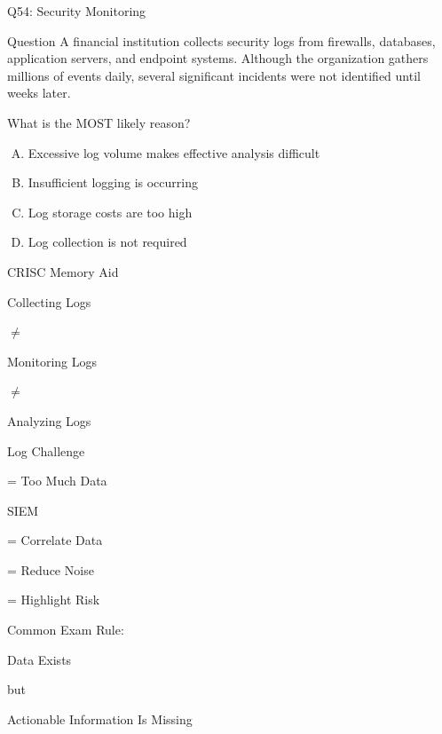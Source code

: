 \documentclass{beamer}
\begin{document}
	
	
	\begin{frame}[shrink=10]{Q54: Security Monitoring}
		\begin{block}{Question}
			A financial institution collects security logs from firewalls,
			databases, application servers, and endpoint systems. Although
			the organization gathers millions of events daily, several
			significant incidents were not identified until weeks later.
			
			What is the MOST likely reason?
		\end{block}
		
		\begin{enumerate}[(A)]
			\item Excessive log volume makes effective analysis difficult
			\item Insufficient logging is occurring
			\item Log storage costs are too high
			\item Log collection is not required
		\end{enumerate}
				\begin{block}{CRISC Memory Aid}
			
			Collecting Logs
			
			$\neq$
			
			Monitoring Logs
			
			$\neq$
			
			Analyzing Logs
			
			\vspace{0.15cm}
			
			Log Challenge
			
			= Too Much Data
			
			\vspace{0.1cm}
			
			SIEM
			
			= Correlate Data
			
			= Reduce Noise
			
			= Highlight Risk
			
			\vspace{0.1cm}
			
			Common Exam Rule:
			
			Data Exists
			
			but
			
			Actionable Information Is Missing
			
		\end{block}
	\end{frame}
	
\end{document}
